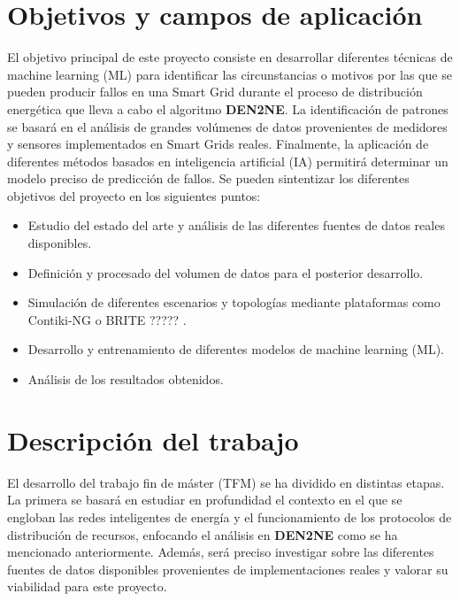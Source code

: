 \vspace{0.3cm}

\section{Objetivos y campos de aplicación}
\vspace{0.3cm}

El objetivo principal de este proyecto consiste en desarrollar diferentes técnicas de machine learning (ML) para identificar las circunstancias o motivos por las que se pueden producir fallos en una Smart Grid durante el proceso de distribución energética que lleva a cabo el algoritmo \textbf{DEN2NE}. La identificación de patrones se basará en el análisis de grandes volúmenes de datos provenientes de medidores y sensores implementados en Smart Grids reales. Finalmente, la aplicación de diferentes métodos basados en inteligencia artificial (IA) permitirá determinar un modelo preciso de predicción de fallos. Se pueden sintentizar los diferentes objetivos del proyecto en los siguientes puntos:

\begin{itemize}
    \item Estudio del estado del arte y análisis de las diferentes fuentes de datos reales disponibles.
    \item Definición y procesado del volumen de datos para el posterior desarrollo. 
    \item Simulación de diferentes escenarios y topologías mediante plataformas como Contiki-NG o BRITE ????? .
    \item Desarrollo y entrenamiento de diferentes modelos de machine learning (ML).
    \item Análisis de los resultados obtenidos.
\end{itemize}

\vspace{0.3cm}

\section{Descripción del trabajo}
\vspace{0.3cm}

El desarrollo del trabajo fin de máster (TFM) se ha dividido en distintas etapas. La primera se basará en estudiar en profundidad el contexto en el que se engloban las redes inteligentes de energía y el funcionamiento de los protocolos de distribución de recursos, enfocando el análisis en \textbf{DEN2NE} como se ha mencionado anteriormente. Además, será preciso investigar sobre las diferentes fuentes de datos disponibles provenientes de implementaciones reales y valorar su viabilidad para este proyecto. 

